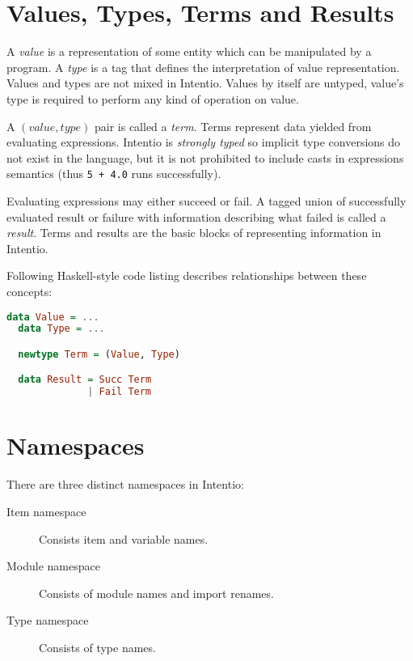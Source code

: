 \section{Values, Types, Terms and Results}

A \emph{value} is a representation of some entity which can be manipulated by a program. A \emph{type} is a tag that defines the interpretation of value representation. Values and types are not mixed in Intentio. Values by itself are untyped, value's type is required to perform any kind of operation on value.

A \((value, type)\) pair is called a \emph{term}. Terms represent data yielded from evaluating expressions. Intentio is \emph{strongly typed} so implicit type conversions do not exist in the language, but it is not prohibited to include casts in expressions semantics (thus \lstinline{5 + 4.0} runs successfully).

Evaluating expressions may either succeed or fail. A tagged union of successfully evaluated result or failure with information describing what failed is called a \emph{result}. Terms and results are the basic blocks of representing information in Intentio.

Following Haskell-style code listing describes relationships between these concepts:

\begin{lstlisting}[language=haskell]
  data Value = ...
  data Type = ...

  newtype Term = (Value, Type)

  data Result = Succ Term
              | Fail Term
\end{lstlisting}


\section{Namespaces}

There are three distinct namespaces in Intentio:

\begin{description}
  \item [Item namespace] Consists item and variable names.
  \item [Module namespace] Consists of module names and import renames.
  \item [Type namespace] Consists of type names.
\end{description}

